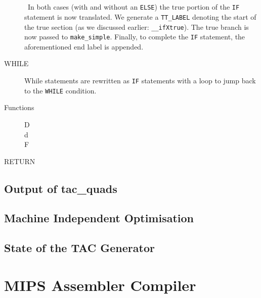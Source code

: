 \begin{description}
\\ \ \\ \
In both cases (with and without an \verb!ELSE!) the true portion of the \verb!IF! statement is now translated. We generate a \verb!TT_LABEL! denoting the start of the true section (as we discussed earlier: \verb!__ifXtrue!). The true branch is now passed to \verb!make_simple!. Finally, to complete the \verb!IF! statement, the aforementioned end label is appended.
	\item[WHILE] While statements are rewritten as \verb!IF! statements with a loop to jump back to the \verb!WHILE! condition.
	\item[Functions]
		\begin{description}
			\item[D]
			\item[d]
			\item[F]
		\end{description}
	\item[RETURN]
\end{description}

\subsection{Output of tac\_quads}
\subsection{Machine Independent Optimisation}
\subsection{State of the TAC Generator}

\section{MIPS Assembler Compiler}
\label{section:MIPS}